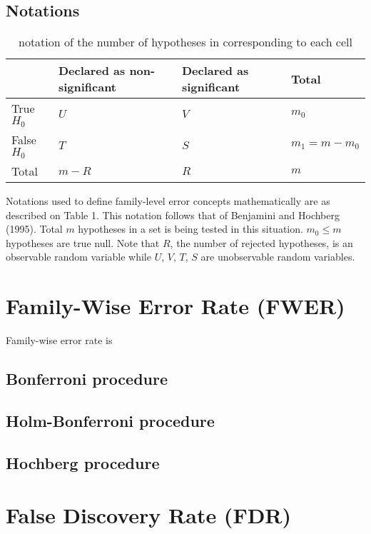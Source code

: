 \documentclass[a4paper, 11pt, oneside]{article}
\begin{document}
\subsection{Notations}
\begin{table}[ht]
    \small
    \setlength{\tabcolsep}{3pt}
\centering
\begin{tabularx}{.7\hsize}{@{}l LLL@{}}
    \toprule
 & Declared as non-significant  & Declared as significant & Total \\
    \midrule
True $H_0$ 
    & $U$ 
        & $V$ 
            & $m_0$ \\
False $H_0$ 
    & $T$ 
        & $S$
            &  $m_1=m-m_0$ \\
Total & $m-R$ 
        & $R$ 
            & $m$ \\
    \bottomrule
\end{tabularx}
\caption{notation of the number of hypotheses in corresponding to each cell}
    \end{table}

Notations used to define family-level error concepts mathematically are as described on Table 1. This notation follows that of Benjamini and Hochberg (1995). Total $m$ hypotheses in a set is being tested in this situation. $m_0 \leq m$ hypotheses are true null. Note that $R$, the number of rejected hypotheses, is an observable random variable while $U$, $V$, $T$, $S$ are unobservable random variables.
\vspace{0.2in}


\section{Family-Wise Error Rate (FWER)}
Family-wise error rate is 
\subsection{Bonferroni procedure}
\subsection{Holm-Bonferroni procedure}
\subsection{Hochberg procedure}
\vspace{0.2in}


\section{False Discovery Rate (FDR)}
\end{document}
